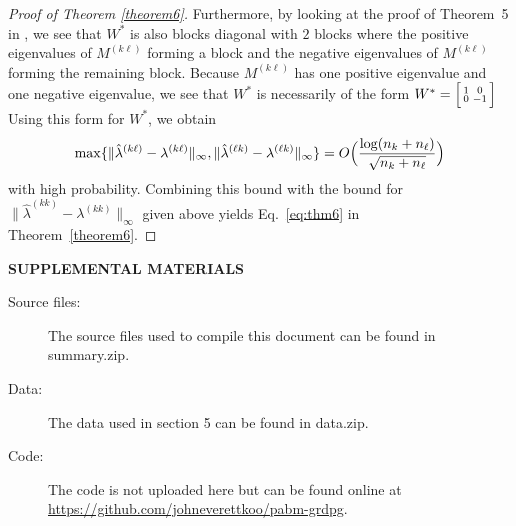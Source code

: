 \documentclass[12pt]{article}
\begin{document}
\begin{proof}[Proof of Theorem \ref{theorem6}]
Furthermore, by looking at the proof of Theorem~5 in
\citep{rubindelanchy2017statistical}, we see that $W^{*}$ is also
blocks diagonal with $2$ blocks where the positive eigenvalues of $M^{(k \ell)}$
forming a block and the negative eigenvalues of $M^{(k \ell)}$ forming
the remaining block. 
Because $M^{(k \ell)}$ has one positive eigenvalue and one negative
eigenvalue, we see that $W^{*}$ is necessarily of the form $W^{*}
= \Bigl[\begin{smallmatrix} 1 & 0 \\ 0 & - 1\end{smallmatrix}\Bigr]$
Using this form for $W^{*}$, we obtain
$$\max\{\|\hat{\lambda}^{(k \ell)} - \lambda^{(k \ell)}\|_{\infty},
\|\hat{\lambda}^{(\ell k)} - \lambda^{(\ell k)}\|_{\infty}\}  =
O\Bigl(\frac{\log(n_k + n_{\ell})}{\sqrt{n_k + n_{\ell}}}\Bigr)$$
with high probability. Combining this bound with the bound for
$\|\hat{\lambda}^{(kk)} - \lambda^{(kk)}\|_{\infty}$ given above
yields Eq.~\eqref{eq:thm6} in Theorem~\ref{theorem6}. 
\end{proof}

\bigskip
\begin{center}
{\large\bf SUPPLEMENTAL MATERIALS}
\end{center}

\begin{description}

\item[Source files:] The source files used to compile this document can be found in summary.zip.

\item[Data:] The data used in section 5 can be found in data.zip.

\item[Code:] The code is not uploaded here but can be found online at \\
\url{https://github.com/johneverettkoo/pabm-grdpg}.

\end{description}

\renewcommand\refname{References}
% 
% 
\printbibliography
\end{document}
